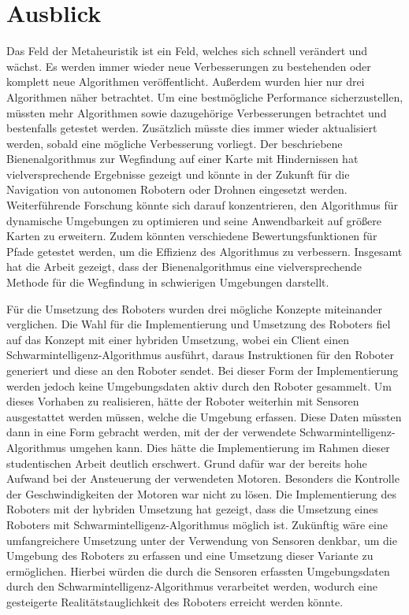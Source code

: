 
\section{Ausblick}
Das Feld der Metaheuristik ist ein Feld, welches sich schnell verändert und wächst. Es werden immer wieder neue Verbesserungen zu bestehenden oder komplett neue Algorithmen veröffentlicht. Außerdem wurden hier nur drei Algorithmen näher betrachtet. Um eine bestmögliche Performance sicherzustellen, müssten mehr Algorithmen sowie dazugehörige Verbesserungen betrachtet und bestenfalls getestet werden. Zusätzlich müsste dies immer wieder aktualisiert werden, sobald eine mögliche Verbesserung vorliegt.
Der beschriebene Bienenalgorithmus zur Wegfindung auf einer Karte mit Hindernissen hat vielversprechende Ergebnisse gezeigt und könnte in der Zukunft für die Navigation von autonomen Robotern oder Drohnen eingesetzt werden. Weiterführende Forschung könnte sich darauf konzentrieren, den Algorithmus für dynamische Umgebungen zu optimieren und seine Anwendbarkeit auf größere Karten zu erweitern. Zudem könnten verschiedene Bewertungsfunktionen für Pfade getestet werden, um die Effizienz des Algorithmus zu verbessern. Insgesamt hat die Arbeit gezeigt, dass der Bienenalgorithmus eine vielversprechende Methode für die Wegfindung in schwierigen Umgebungen darstellt.

Für die Umsetzung des Roboters wurden drei mögliche Konzepte miteinander verglichen. Die Wahl für die Implementierung und Umsetzung des Roboters fiel auf das Konzept mit einer hybriden Umsetzung, wobei ein Client einen Schwarmintelligenz-Algorithmus ausführt, daraus Instruktionen für den Roboter generiert und diese an den Roboter sendet. Bei dieser Form der Implementierung werden jedoch keine Umgebungsdaten aktiv durch den Roboter gesammelt. Um dieses Vorhaben zu realisieren, hätte der Roboter weiterhin mit Sensoren ausgestattet werden müssen, welche die Umgebung erfassen. Diese Daten müssten dann in eine Form gebracht werden, mit der der verwendete Schwarmintelligenz-Algorithmus umgehen kann. Dies hätte die Implementierung im Rahmen dieser studentischen Arbeit deutlich erschwert. Grund dafür war der bereits hohe Aufwand bei der Ansteuerung der verwendeten Motoren. Besonders die Kontrolle der Geschwindigkeiten der Motoren war nicht zu lösen. Die Implementierung des Roboters mit der hybriden Umsetzung hat gezeigt, dass die Umsetzung eines Roboters mit Schwarmintelligenz-Algorithmus möglich ist. Zukünftig wäre eine umfangreichere Umsetzung unter der Verwendung von Sensoren denkbar, um die Umgebung des Roboters zu erfassen und eine Umsetzung dieser Variante zu ermöglichen. Hierbei würden die durch die Sensoren erfassten Umgebungsdaten durch den Schwarmintelligenz-Algorithmus verarbeitet werden, wodurch eine gesteigerte Realitätstauglichkeit des Roboters erreicht werden könnte.